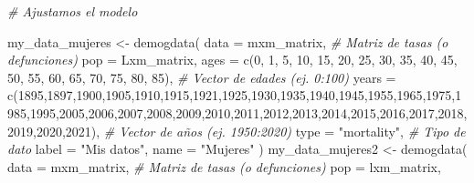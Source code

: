 \documentclass[
]{article}
\newenvironment{Shaded}{\begin{snugshade}}{\end{snugshade}}
\newcommand{\AttributeTok}[1]{\textcolor[rgb]{0.77,0.63,0.00}{#1}}
\newcommand{\CommentTok}[1]{\textcolor[rgb]{0.56,0.35,0.01}{\textit{#1}}}
\newcommand{\DecValTok}[1]{\textcolor[rgb]{0.00,0.00,0.81}{#1}}
\newcommand{\FunctionTok}[1]{\textcolor[rgb]{0.00,0.00,0.00}{#1}}
\newcommand{\NormalTok}[1]{#1}
\newcommand{\OtherTok}[1]{\textcolor[rgb]{0.56,0.35,0.01}{#1}}
\newcommand{\StringTok}[1]{\textcolor[rgb]{0.31,0.60,0.02}{#1}}
\begin{document}
\begin{Shaded}
\begin{Highlighting}[]
\CommentTok{\# Ajustamos el modelo }

\NormalTok{my\_data\_mujeres }\OtherTok{\textless{}{-}} \FunctionTok{demogdata}\NormalTok{(}
  \AttributeTok{data =}\NormalTok{ mxm\_matrix,           }\CommentTok{\# Matriz de tasas (o defunciones)}
  \AttributeTok{pop =}\NormalTok{ Lxm\_matrix,}
  \AttributeTok{ages =} \FunctionTok{c}\NormalTok{(}\DecValTok{0}\NormalTok{, }\DecValTok{1}\NormalTok{, }\DecValTok{5}\NormalTok{, }\DecValTok{10}\NormalTok{, }\DecValTok{15}\NormalTok{, }\DecValTok{20}\NormalTok{, }\DecValTok{25}\NormalTok{, }\DecValTok{30}\NormalTok{, }\DecValTok{35}\NormalTok{, }\DecValTok{40}\NormalTok{, }\DecValTok{45}\NormalTok{, }\DecValTok{50}\NormalTok{, }\DecValTok{55}\NormalTok{, }\DecValTok{60}\NormalTok{, }\DecValTok{65}\NormalTok{, }\DecValTok{70}\NormalTok{, }\DecValTok{75}\NormalTok{, }\DecValTok{80}\NormalTok{, }\DecValTok{85}\NormalTok{),       }\CommentTok{\# Vector de edades (ej. 0:100)}
  \AttributeTok{years =} \FunctionTok{c}\NormalTok{(}\DecValTok{1895}\NormalTok{,}\DecValTok{1897}\NormalTok{,}\DecValTok{1900}\NormalTok{,}\DecValTok{1905}\NormalTok{,}\DecValTok{1910}\NormalTok{,}\DecValTok{1915}\NormalTok{,}\DecValTok{1921}\NormalTok{,}\DecValTok{1925}\NormalTok{,}\DecValTok{1930}\NormalTok{,}\DecValTok{1935}\NormalTok{,}\DecValTok{1940}\NormalTok{,}\DecValTok{1945}\NormalTok{,}\DecValTok{1955}\NormalTok{,}\DecValTok{1965}\NormalTok{,}\DecValTok{1975}\NormalTok{,}\DecValTok{1985}\NormalTok{,}\DecValTok{1995}\NormalTok{,}\DecValTok{2005}\NormalTok{,}\DecValTok{2006}\NormalTok{,}\DecValTok{2007}\NormalTok{,}\DecValTok{2008}\NormalTok{,}\DecValTok{2009}\NormalTok{,}\DecValTok{2010}\NormalTok{,}\DecValTok{2011}\NormalTok{,}\DecValTok{2012}\NormalTok{,}\DecValTok{2013}\NormalTok{,}\DecValTok{2014}\NormalTok{,}\DecValTok{2015}\NormalTok{,}\DecValTok{2016}\NormalTok{,}\DecValTok{2017}\NormalTok{,}\DecValTok{2018}\NormalTok{,}\DecValTok{2019}\NormalTok{,}\DecValTok{2020}\NormalTok{,}\DecValTok{2021}\NormalTok{),        }\CommentTok{\# Vector de años (ej. 1950:2020)}
  \AttributeTok{type =} \StringTok{"mortality"}\NormalTok{,  }\CommentTok{\# Tipo de dato}
  \AttributeTok{label =} \StringTok{"Mis datos"}\NormalTok{,}
  \AttributeTok{name =} \StringTok{"Mujeres"}
\NormalTok{)}
\NormalTok{my\_data\_mujeres2 }\OtherTok{\textless{}{-}} \FunctionTok{demogdata}\NormalTok{(}
  \AttributeTok{data =}\NormalTok{ mxm\_matrix,           }\CommentTok{\# Matriz de tasas (o defunciones)}
  \AttributeTok{pop =}\NormalTok{ lxm\_matrix,}

\end{Highlighting}
\end{Shaded}
\end{document}
